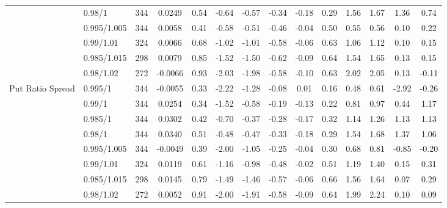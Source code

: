 \begin{tabular}{llcccccccccccc}
 & 0.98/1 & 344 & 0.0249 & 0.54 & -0.64 & -0.57 & -0.34 & -0.18 & 0.29 & 1.56 & 1.67 & 1.36 & 0.74 \\
 & 0.995/1.005 & 344 & 0.0058 & 0.41 & -0.58 & -0.51 & -0.46 & -0.04 & 0.50 & 0.55 & 0.56 & 0.10 & 0.22 \\
 & 0.99/1.01 & 324 & 0.0066 & 0.68 & -1.02 & -1.01 & -0.58 & -0.06 & 0.63 & 1.06 & 1.12 & 0.10 & 0.15 \\
 & 0.985/1.015 & 298 & 0.0079 & 0.85 & -1.52 & -1.50 & -0.62 & -0.09 & 0.64 & 1.54 & 1.65 & 0.13 & 0.15 \\
 & 0.98/1.02 & 272 & -0.0066 & 0.93 & -2.03 & -1.98 & -0.58 & -0.10 & 0.63 & 2.02 & 2.05 & 0.13 & -0.11 \\
Put Ratio Spread & 0.995/1 & 344 & -0.0055 & 0.33 & -2.22 & -1.28 & -0.08 & 0.01 & 0.16 & 0.48 & 0.61 & -2.92 & -0.26 \\
 & 0.99/1 & 344 & 0.0254 & 0.34 & -1.52 & -0.58 & -0.19 & -0.13 & 0.22 & 0.81 & 0.97 & 0.44 & 1.17 \\
 & 0.985/1 & 344 & 0.0302 & 0.42 & -0.70 & -0.37 & -0.28 & -0.17 & 0.32 & 1.14 & 1.26 & 1.13 & 1.13 \\
 & 0.98/1 & 344 & 0.0340 & 0.51 & -0.48 & -0.47 & -0.33 & -0.18 & 0.29 & 1.54 & 1.68 & 1.37 & 1.06 \\
 & 0.995/1.005 & 344 & -0.0049 & 0.39 & -2.00 & -1.05 & -0.25 & -0.04 & 0.30 & 0.68 & 0.81 & -0.85 & -0.20 \\
 & 0.99/1.01 & 324 & 0.0119 & 0.61 & -1.16 & -0.98 & -0.48 & -0.02 & 0.51 & 1.19 & 1.40 & 0.15 & 0.31 \\
 & 0.985/1.015 & 298 & 0.0145 & 0.79 & -1.49 & -1.46 & -0.57 & -0.06 & 0.66 & 1.56 & 1.64 & 0.07 & 0.29 \\
 & 0.98/1.02 & 272 & 0.0052 & 0.91 & -2.00 & -1.91 & -0.58 & -0.09 & 0.64 & 1.99 & 2.24 & 0.10 & 0.09 \\
\bottomrule
\end{tabular}
